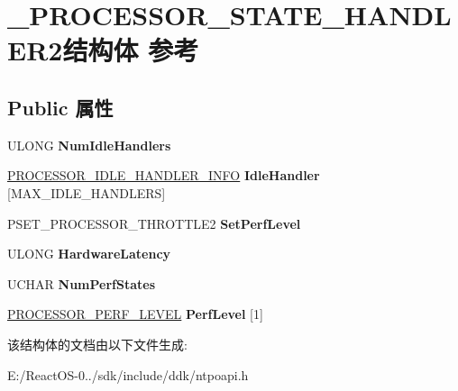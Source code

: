\hypertarget{struct___p_r_o_c_e_s_s_o_r___s_t_a_t_e___h_a_n_d_l_e_r2}{}\section{\+\_\+\+P\+R\+O\+C\+E\+S\+S\+O\+R\+\_\+\+S\+T\+A\+T\+E\+\_\+\+H\+A\+N\+D\+L\+E\+R2结构体 参考}
\label{struct___p_r_o_c_e_s_s_o_r___s_t_a_t_e___h_a_n_d_l_e_r2}
\subsection*{Public 属性}
\begin{DoxyCompactItemize}
\item 
\mbox{\label{struct___p_r_o_c_e_s_s_o_r___s_t_a_t_e___h_a_n_d_l_e_r2_aa78016ec96f3929220ee6f7600145943}} 
U\+L\+O\+NG {\bfseries Num\+Idle\+Handlers}
\item 
\mbox{\label{struct___p_r_o_c_e_s_s_o_r___s_t_a_t_e___h_a_n_d_l_e_r2_a49eba7cab7646457cf13dacfe09edc46}} 
\hyperlink{struct___p_r_o_c_e_s_s_o_r___i_d_l_e___h_a_n_d_l_e_r___i_n_f_o}{P\+R\+O\+C\+E\+S\+S\+O\+R\+\_\+\+I\+D\+L\+E\+\_\+\+H\+A\+N\+D\+L\+E\+R\+\_\+\+I\+N\+FO} {\bfseries Idle\+Handler} \mbox{[}M\+A\+X\+\_\+\+I\+D\+L\+E\+\_\+\+H\+A\+N\+D\+L\+E\+RS\mbox{]}
\item 
\mbox{\label{struct___p_r_o_c_e_s_s_o_r___s_t_a_t_e___h_a_n_d_l_e_r2_a8102ede9802d81c8427190c0f93773f7}} 
P\+S\+E\+T\+\_\+\+P\+R\+O\+C\+E\+S\+S\+O\+R\+\_\+\+T\+H\+R\+O\+T\+T\+L\+E2 {\bfseries Set\+Perf\+Level}
\item 
\mbox{\label{struct___p_r_o_c_e_s_s_o_r___s_t_a_t_e___h_a_n_d_l_e_r2_a93f4ddaefba71b32e3c80e96d7e2dbcd}} 
U\+L\+O\+NG {\bfseries Hardware\+Latency}
\item 
\mbox{\label{struct___p_r_o_c_e_s_s_o_r___s_t_a_t_e___h_a_n_d_l_e_r2_ad9274aa26b710857fe79d060260bbf8e}} 
U\+C\+H\+AR {\bfseries Num\+Perf\+States}
\item 
\mbox{\label{struct___p_r_o_c_e_s_s_o_r___s_t_a_t_e___h_a_n_d_l_e_r2_ab60e606a93c23f4d7249579cd754c9cb}} 
\hyperlink{struct___p_r_o_c_e_s_s_o_r___p_e_r_f___l_e_v_e_l}{P\+R\+O\+C\+E\+S\+S\+O\+R\+\_\+\+P\+E\+R\+F\+\_\+\+L\+E\+V\+EL} {\bfseries Perf\+Level} \mbox{[}1\mbox{]}
\end{DoxyCompactItemize}


该结构体的文档由以下文件生成\+:\begin{DoxyCompactItemize}
\item 
E\+:/\+React\+O\+S-\/0../sdk/include/ddk/ntpoapi.\+h\end{DoxyCompactItemize}
